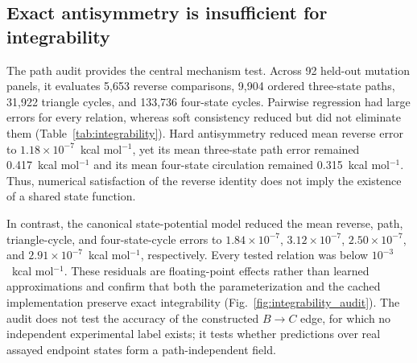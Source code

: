 \documentclass[preprint,12pt]{elsarticle}
\begin{document}
\subsection{Exact antisymmetry is insufficient for integrability}
\label{sec:integrability_results}

The path audit provides the central mechanism test. Across 92 held-out mutation panels, it evaluates 5,653 reverse comparisons, 9,904 ordered three-state paths, 31,922 triangle cycles, and 133,736 four-state cycles. Pairwise regression had large errors for every relation, whereas soft consistency reduced but did not eliminate them (Table~\ref{tab:integrability}). Hard antisymmetry reduced mean reverse error to $1.18\times10^{-7}$~kcal mol$^{-1}$, yet its mean three-state path error remained 0.417~kcal mol$^{-1}$ and its mean four-state circulation remained 0.315~kcal mol$^{-1}$. Thus, numerical satisfaction of the reverse identity does not imply the existence of a shared state function.

In contrast, the canonical state-potential model reduced the mean reverse, path, triangle-cycle, and four-state-cycle errors to $1.84\times10^{-7}$, $3.12\times10^{-7}$, $2.50\times10^{-7}$, and $2.91\times10^{-7}$~kcal mol$^{-1}$, respectively. Every tested relation was below $10^{-3}$~kcal mol$^{-1}$. These residuals are floating-point effects rather than learned approximations and confirm that both the parameterization and the cached implementation preserve exact integrability (Fig.~\ref{fig:integrability_audit}). The audit does not test the accuracy of the constructed $B\rightarrow C$ edge, for which no independent experimental label exists; it tests whether predictions over real assayed endpoint states form a path-independent field.

\begin{table}[t]
\centering
\caption{Held-out real-state integrability audit. Entries are mean absolute error with the 95th percentile in parentheses, in kcal mol$^{-1}$. Full medians, maxima, and threshold fractions are reported in Supplementary Table~S2.}
\label{tab:integrability}
\end{table}
\end{document}
